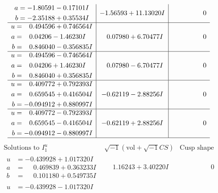 \documentclass[1p]{elsarticle_modified}
\theoremstyle{definition}
\newcommand{\I}{\sqrt{-1}}
\begin{document}
$$\begin{array}{c|c|c}
\begin{aligned}
a &= -1.80591 - 0.17101 I \\
b &= -2.35188 + 0.35534 I\end{aligned}
 & -1.56593 + 11.13020 I & \phantom{-0.000000 } 0 \\ \hline\begin{aligned}
u &= \phantom{-}0.494596 + 0.746564 I \\
a &= \phantom{-}0.04206 - 1.46230 I \\
b &= \phantom{-}0.846040 - 0.356835 I\end{aligned}
 & \phantom{-}0.07980 + 6.70477 I & \phantom{-0.000000 } 0 \\ \hline\begin{aligned}
u &= \phantom{-}0.494596 - 0.746564 I \\
a &= \phantom{-}0.04206 + 1.46230 I \\
b &= \phantom{-}0.846040 + 0.356835 I\end{aligned}
 & \phantom{-}0.07980 - 6.70477 I & \phantom{-0.000000 } 0 \\ \hline\begin{aligned}
u &= \phantom{-}0.409772 + 0.792393 I \\
a &= \phantom{-}0.659545 + 0.416504 I \\
b &= -0.094912 + 0.880997 I\end{aligned}
 & -0.62119 - 2.88256 I & \phantom{-0.000000 } 0 \\ \hline\begin{aligned}
u &= \phantom{-}0.409772 - 0.792393 I \\
a &= \phantom{-}0.659545 - 0.416504 I \\
b &= -0.094912 - 0.880997 I\end{aligned}
 & -0.62119 + 2.88256 I & \phantom{-0.000000 } 0\\
 \hline 
 \end{array}$$\newpage$$\begin{array}{c|c|c}  
\text{Solutions to }I^u_{1}& \I (\text{vol} + \sqrt{-1}CS) & \text{Cusp shape}\\
 \hline 
\begin{aligned}
u &= -0.439928 + 1.017320 I \\
a &= \phantom{-}0.469839 + 0.363233 I \\
b &= \phantom{-}0.101180 + 0.549735 I\end{aligned}
 & \phantom{-}1.16243 + 3.40220 I & \phantom{-0.000000 } 0 \\ \hline\begin{aligned}
u &= -0.439928 - 1.017320 I \\

\end{aligned}
\end{array}$$
\end{document}
